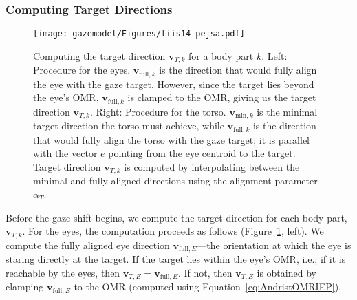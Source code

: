 \subsubsection{Computing Target Directions}
\label{sec:GazeShiftTargetDirections}

\begin{figure}[t]
\centering
\texttt{[image: gazemodel/Figures/tiis14-pejsa.pdf]}
\caption{Computing the target direction $\mathbf{v}_{T,k}$ for a body part $k$. Left: Procedure for the eyes. $\mathbf{v}_{\mathrm{full},k}$ is the direction that would fully align the eye with the gaze target. However, since the target lies beyond the eye's OMR, $\mathbf{v}_{\mathrm{full},k}$ is clamped to the OMR, giving us the target direction $\mathbf{v}_{T,k}$. Right: Procedure for the torso. $\mathbf{v}_{\mathrm{min},k}$ is the minimal target direction the torso must achieve, while $\mathbf{v}_{\mathrm{full},k}$ is the direction that would fully align the torso with the gaze target; it is parallel with the vector $e$ pointing from the eye centroid to the target. Target direction $\mathbf{v}_{T,k}$ is computed by interpolating between the minimal and fully aligned directions using the alignment parameter $\alpha_T$.}
\label{fig:GazeShiftTargetRot}
\end{figure}

Before the gaze shift begins, we compute the target direction for each body part, $\mathbf{v}_{T,k}$. For the eyes, the computation proceeds as follows (Figure~\ref{fig:GazeShiftTargetRot}, left). We compute the fully aligned eye direction $\mathbf{v}_{\mathrm{full},E}$---the orientation at which the eye is staring directly at the target. If the target lies within the eye's OMR, i.e., if it is reachable by the eyes, then $\mathbf{v}_{T,E} = \mathbf{v}_{\mathrm{full},E}$. If not, then $\mathbf{v}_{T,E}$ is obtained by clamping $\mathbf{v}_{\mathrm{full},E}$ to the OMR (computed using Equation~\ref{eq:AndristOMRIEP}).

